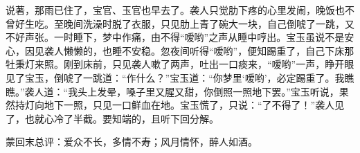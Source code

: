 \begin{parag}
    说著，那雨已住了，宝官、玉官也早去了。袭人只觉肋下疼的心里发闹，晚饭也不曾好生吃。至晚间洗澡时脱了衣服，只见肋上青了碗大一块，自己倒唬了一跳，又不好声张。一时睡下，梦中作痛，由不得“嗳哟”之声从睡中哼出。宝玉虽说不是安心，因见袭人懒懒的，也睡不安稳。忽夜间听得“嗳哟”，便知踢重了，自己下床那牡秉灯来照。刚到床前，只见袭人嗽了两声，吐出一口痰来，“嗳哟”一声，睁开眼见了宝玉，倒唬了一跳道：“作什么？”宝玉道：“你梦里‘嗳哟’，必定踢重了。我瞧瞧。”袭人道：“我头上发晕，嗓子里又腥又甜，你倒照一照地下罢。”宝玉听说，果然持灯向地下一照，只见一口鲜血在地。宝玉慌了，只说：“了不得了！”袭人见了，也就心冷了半截。要知端的，且听下回分解。
\end{parag}


\begin{parag}
    \begin{note}蒙回末总评：爱众不长，多情不寿；风月情怀，醉人如酒。\end{note}
\end{parag}